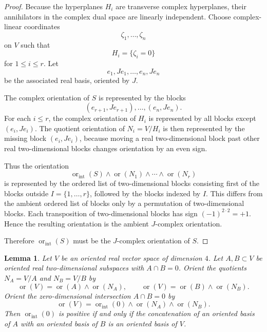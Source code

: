 \documentclass[12pt]{article}
\newtheorem{lemma}[theorem]{Lemma}
\begin{document}
\begin{proof}
Because the hyperplanes \(H_i\) are transverse complex hyperplanes, their annihilators in the complex dual space are linearly independent. Choose complex-linear coordinates
\[
\zeta_1,\dots,\zeta_n
\]
on \(V\) such that
\[
H_i=\{\zeta_i=0\}
\]
for \(1\le i\le r\). Let
\[
e_1,Je_1,\dots,e_n,Je_n
\]
be the associated real basis, oriented by \(J\).

The complex orientation of \(S\) is represented by the blocks
\[
(e_{r+1},Je_{r+1}),\dots,(e_n,Je_n).
\]
For each \(i\le r\), the complex orientation of \(H_i\) is represented by all blocks except \((e_i,Je_i)\). The quotient orientation of \(N_i=V/H_i\) is then represented by the missing block \((e_i,Je_i)\), because moving a real two-dimensional block past other real two-dimensional blocks changes orientation by an even sign.

Thus the orientation
\[
\operatorname{or}_{\mathrm{int}}(S)
\wedge
\operatorname{or}(N_1)\wedge\cdots\wedge\operatorname{or}(N_r)
\]
is represented by the ordered list of two-dimensional blocks consisting first of the blocks outside \(I=\{1,\dots,r\}\), followed by the blocks indexed by \(I\). This differs from the ambient ordered list of blocks only by a permutation of two-dimensional blocks. Each transposition of two-dimensional blocks has sign \((-1)^{2\cdot 2}=+1\). Hence the resulting orientation is the ambient \(J\)-complex orientation.

Therefore \(\operatorname{or}_{\mathrm{int}}(S)\) must be the \(J\)-complex orientation of \(S\).
\end{proof}

\begin{lemma}\label{lem:two-surface-sign}
Let \(V\) be an oriented real vector space of dimension \(4\). Let \(A,B\subset V\) be oriented real two-dimensional subspaces with \(A\cap B=0\). Orient the quotients \(N_A=V/A\) and \(N_B=V/B\) by
\[
\operatorname{or}(V)=\operatorname{or}(A)\wedge\operatorname{or}(N_A),
\qquad
\operatorname{or}(V)=\operatorname{or}(B)\wedge\operatorname{or}(N_B).
\]
Orient the zero-dimensional intersection \(A\cap B=0\) by
\[
\operatorname{or}(V)=\operatorname{or}_{\mathrm{int}}(0)\wedge \operatorname{or}(N_A)\wedge\operatorname{or}(N_B).
\]
Then \(\operatorname{or}_{\mathrm{int}}(0)\) is positive if and only if the concatenation of an oriented basis of \(A\) with an oriented basis of \(B\) is an oriented basis of \(V\).
\end{lemma}
\end{document}
